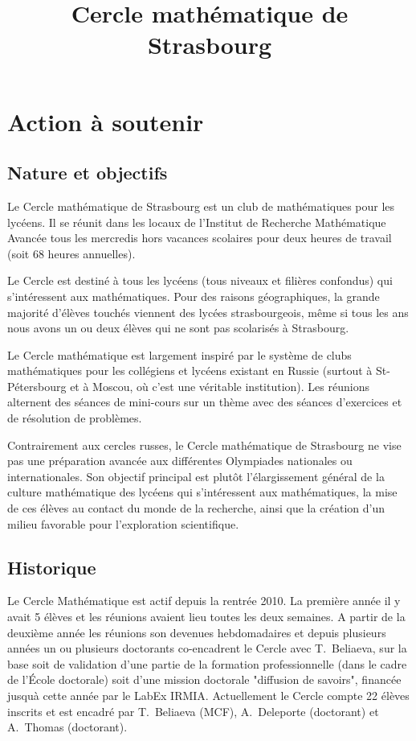 \documentclass[11pt,notitlepage]{article}
\title{Cercle math\'ematique de Strasbourg}
\date{}
\begin{document}
\maketitle

\section{Action \`a soutenir}

\subsection{Nature et objectifs}
 
 Le Cercle math\'ematique de Strasbourg est un club de math\'ematiques pour les lyc\'eens. 
 Il se r\'eunit dans les locaux de l'Institut de Recherche Math\'ematique Avanc\'ee tous  les mercredis hors vacances scolaires pour deux heures de travail (soit 68 heures annuelles).
 
 Le Cercle est destin\'e \`a tous les lyc\'eens (tous niveaux et fili\`eres confondus) qui s'int\'eressent aux math\'ematiques. Pour des raisons g\'eographiques, la grande majorit\'e d'\'el\`eves 
 touch\'es viennent des lyc\'ees strasbourgeois, m\^eme si tous les ans nous avons un ou deux \'el\`eves qui ne sont pas scolaris\'es \`a Strasbourg. 
 
 Le Cercle math\'ematique est largement inspir\'e par le syst\`eme de
 clubs math\'ematiques pour les coll\'egiens et lyc\'eens existant en
 Russie (surtout \`a St-P\'etersbourg et \`a Moscou, o\`u c'est une  v\'eritable institution). Les r\'eunions alternent des s\'eances de mini-cours sur un th\`eme
 avec des s\'eances d'exercices et de r\'esolution de probl\`emes. 
 
 Contrairement aux cercles russes, le Cercle math\'ematique de
 Strasbourg ne vise pas une pr\'eparation avanc\'ee aux diff\'erentes
 Olympiades nationales ou internationales. Son objectif principal est
 plut\^ot l'\'elargissement g\'en\'eral de la culture math\'ematique des
 lyc\'eens qui s'int\'eressent aux math\'e\-matiques, la mise de ces
 \'el\`eves au contact du monde de la recherche, ainsi que la cr\'eation d'un milieu favorable pour l'exploration scientifique.
 
 

\subsection{Historique}
Le Cercle Math\'ematique est actif depuis la rentr\'ee 2010. La premi\`ere ann\'ee il y avait 5 \'el\`eves et les r\'eunions avaient lieu toutes les deux semaines. 
A partir de la deuxi\`eme ann\'ee les r\'eunions son devenues hebdomadaires et depuis plusieurs ann\'ees un ou plusieurs doctorants co-encadrent le Cercle avec T.~Beliaeva, 
sur la base soit de validation d'une partie de la formation professionnelle (dans le cadre de l'\'Ecole doctorale) soit d'une mission doctorale "diffusion de savoirs", 
financ\'ee jusqu\`a cette ann\'ee par le LabEx IRMIA. Actuellement le Cercle  compte 22 \'el\`eves inscrits et est encadr\'e par T.~Beliaeva (MCF), A.~Deleporte (doctorant) et A.~Thomas (doctorant).
\end{document}
